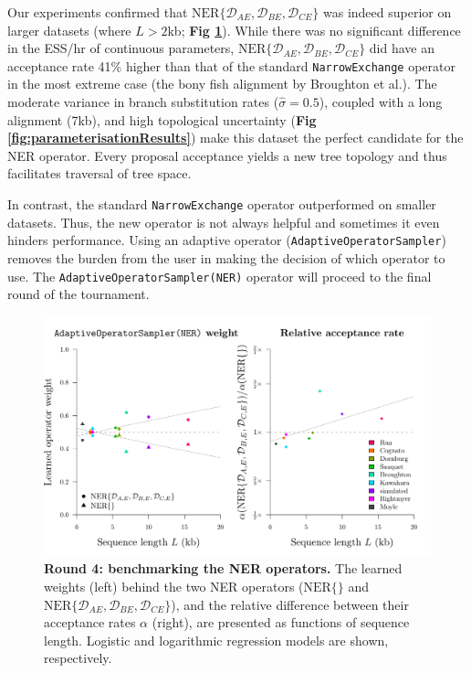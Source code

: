 \documentclass[10pt,letterpaper]{article}
\begin{document}
Our experiments confirmed that $\text{NER}\{\mathcal{D}_{AE}, \mathcal{D}_{BE}, \mathcal{D}_{CE}\}$ was indeed superior on larger datasets (where $L > 2$kb; \textbf{Fig \ref{fig:round4Results}}).
While there was no significant difference in the ESS/hr of continuous parameters, $\text{NER}\{\mathcal{D}_{AE}, \mathcal{D}_{BE}, \mathcal{D}_{CE}\}$ did have an acceptance rate 41\% higher than that of the standard \texttt{NarrowExchange} operator in the most extreme case (the bony fish alignment by Broughton et al.\cite{Broughton_2013}).
The moderate variance in branch substitution rates ($\hat{\sigma} = 0.5$), coupled with a long alignment (7kb), and high topological uncertainty (\textbf{Fig \ref{fig:parameterisationResults}}) make this dataset the perfect candidate for the NER operator. 
Every proposal acceptance yields a new tree topology and thus facilitates traversal of tree space. 


In contrast, the standard \texttt{NarrowExchange} operator outperformed on smaller datasets.
Thus, the new operator is not always helpful and sometimes it even hinders performance.
Using an adaptive operator (\texttt{AdaptiveOperatorSampler}) removes the burden from the user in making the decision of which operator to use.
The \texttt{AdaptiveOperatorSampler(NER)} operator will proceed to the final round of the tournament.



\begin{figure}[!h]
\includegraphics[width=\textwidth]{benchmarking/benchmarkingVM/ESS_round4.pdf}
\caption{\textbf{Round 4: benchmarking the NER operators.} 
The learned weights (left) behind the two NER operators ($\text{NER} \{\}$ and $\text{NER}\{\mathcal{D}_{AE}, \mathcal{D}_{BE}, \mathcal{D}_{CE}\}$), and the relative difference between their acceptance rates $\alpha$ (right), are presented as functions of sequence length.
Logistic and logarithmic regression models are shown, respectively. }
\label{fig:round4Results}
\end{figure}
\end{document}

